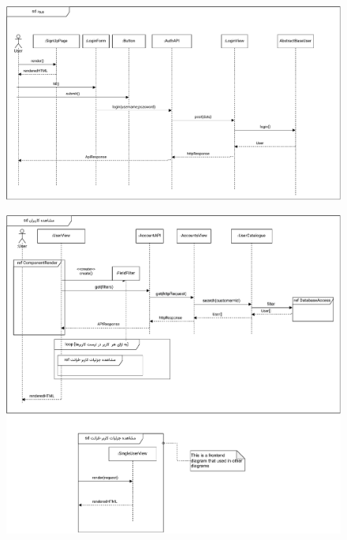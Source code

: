\eject \pdfpagewidth=11in \pdfpageheight=7in
\begin{figure}[ht!]
	\centering
	\includegraphics[scale=0.8]{figs/design-sequence/3-2.pdf}
\end{figure}
\FloatBarrier
\newpage


\eject \pdfpagewidth=12in \pdfpageheight=9in
\begin{figure}[ht!]
	\centering
	\includegraphics[scale=0.8]{figs/design-sequence/3-5.pdf}
\end{figure}
\FloatBarrier
\newpage


